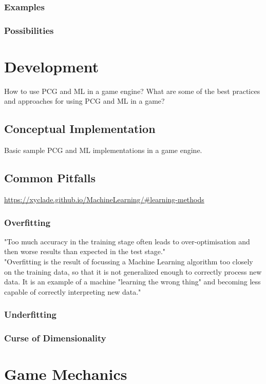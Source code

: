 \documentclass[MGS,Master,english]{twbook}%
\begin{document}
\subsubsection{Examples}
\subsubsection{Possibilities}

\section{Development}
How to use PCG and ML in a game engine? What are some of the best practices and approaches for using PCG and ML in a game?

\subsection{Conceptual Implementation}
Basic sample PCG and ML implementations in a game engine.

\subsection{Common Pitfalls}
\url{https://xyclade.github.io/MachineLearning/#learning-methods}
\subsubsection{Overfitting}
"Too much accuracy in the training stage often leads to over-optimisation and then worse results than expected in the test stage." \cite{ml:2}\\
"Overfitting is the result of focussing a Machine Learning algorithm too closely on the training data, so that it is not generalized enough to correctly process new data. It is an example of a machine "learning the wrong thing" and becoming less capable of correctly interpreting new data." \cite{ml:3}
\subsubsection{Underfitting}
\subsubsection{Curse of Dimensionality}

\section{Game Mechanics}
\end{document}
